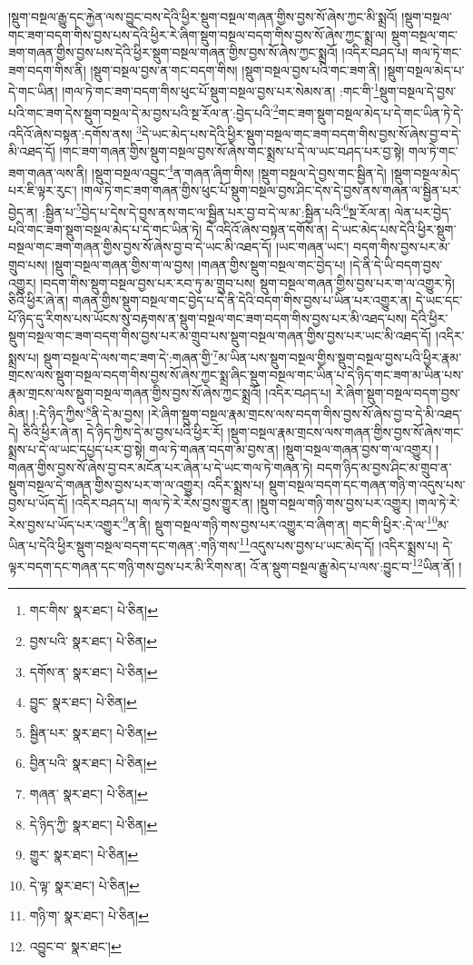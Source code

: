 །སྡུག་བསྔལ་རྒྱུ་དང་རྐྱེན་ལས་བྱུང་བས་དེའི་ཕྱིར་སྡུག་བསྔལ་གཞན་གྱིས་བྱས་སོ་ཞེས་ཀྱང་མི་སྨྲའོ། །སྡུག་བསྔལ་གང་ཟག་བདག་གིས་བྱས་པས་དེའི་ཕྱིར་རེ་ཞིག་སྡུག་བསྔལ་བདག་གིས་བྱས་སོ་ཞེས་ཀྱང་སྨྲ་ལ། སྡུག་བསྔལ་གང་ཟག་གཞན་གྱིས་བྱས་པས་དེའི་ཕྱིར་སྡུག་བསྔལ་གཞན་གྱིས་བྱས་སོ་ཞེས་ཀྱང་སྨྲའོ། །འདིར་བཤད་པ། གལ་ཏེ་གང་ཟག་བདག་གིས་ནི། །སྡུག་བསྔལ་བྱས་ན་གང་བདག་གིས། །སྡུག་བསྔལ་བྱས་པའི་གང་ཟག་ནི། །སྡུག་བསྔལ་མེད་པ་དེ་གང་ཡིན། །གལ་ཏེ་གང་ཟག་བདག་གིས་ཕུང་པོ་སྡུག་བསྔལ་བྱས་པར་སེམས་ན། :གང་གི་\footnote{གང་གིས་  སྣར་ཐང་།  པེ་ཅིན། }སྡུག་བསྔལ་དེ་བྱས་པའི་གང་ཟག་དེས་སྡུག་བསྔལ་དེ་མ་བྱས་པའི་སྔ་རོལ་ན་:བྱེད་པའི་\footnote{བྱས་པའི་  སྣར་ཐང་།  པེ་ཅིན། }གང་ཟག་སྡུག་བསྔལ་མེད་པ་དེ་གང་ཡིན་ཏེ་དེ་འདིའོ་ཞེས་བསྟན་:དགོས་ནས། \footnote{དགོས་ན་  སྣར་ཐང་།  པེ་ཅིན། }དེ་ཡང་མེད་པས་དེའི་ཕྱིར་སྡུག་བསྔལ་གང་ཟག་བདག་གིས་བྱས་སོ་ཞེས་བྱ་བ་དེ་མི་འཐད་དོ། །གང་ཟག་གཞན་གྱིས་སྡུག་བསྔལ་བྱས་སོ་ཞེས་གང་སྨྲས་པ་དེ་ལ་ཡང་བཤད་པར་བྱ་སྟེ། གལ་ཏེ་གང་ཟག་གཞན་ལས་ནི། །སྡུག་བསྔལ་འབྱུང་\footnote{བྱུང་  སྣར་ཐང་།  པེ་ཅིན། }ན་གཞན་ཞིག་གིས། །སྡུག་བསྔལ་དེ་བྱས་གང་སྦྱིན་དེ། །སྡུག་བསྔལ་མེད་པར་ཇི་ལྟར་རུང་། །གལ་ཏེ་གང་ཟག་གཞན་གྱིས་ཕུང་པོ་སྡུག་བསྔལ་བྱས་ཤིང་དེས་དེ་བྱས་ནས་གཞན་ལ་སྦྱིན་པར་བྱེད་ན། :སྦྱིན་པ་\footnote{སྦྱིན་པར་  སྣར་ཐང་།  པེ་ཅིན། }བྱེད་པ་དེས་དེ་བྱས་ནས་གང་ལ་སྦྱིན་པར་བྱ་བ་དེ་ལ་མ་:སྦྱིན་པའི་\footnote{བྱིན་པའི་  སྣར་ཐང་།  པེ་ཅིན། }སྔ་རོལ་ན། ལེན་པར་བྱེད་པའི་གང་ཟག་སྡུག་བསྔལ་མེད་པ་དེ་གང་ཡིན་ཏེ། དེ་འདིའོ་ཞེས་བསྟན་དགོས་ན། དེ་ཡང་མེད་པས་དེའི་ཕྱིར་སྡུག་བསྔལ་གང་ཟག་གཞན་གྱིས་བྱས་སོ་ཞེས་བྱ་བ་དེ་ཡང་མི་འཐད་དོ། །ཡང་གཞན་ཡང་། བདག་གིས་བྱས་པར་མ་གྲུབ་པས། །སྡུག་བསྔལ་གཞན་གྱིས་ག་ལ་བྱས། །གཞན་གྱིས་སྡུག་བསྔལ་གང་བྱེད་པ། །དེ་ནི་དེ་ཡི་བདག་བྱས་འགྱུར། །བདག་གིས་སྡུག་བསྔལ་བྱས་པར་རབ་ཏུ་མ་གྲུབ་པས། སྡུག་བསྔལ་གཞན་གྱིས་བྱས་པར་ག་ལ་འགྱུར་ཏེ། ཅིའི་ཕྱིར་ཞེ་ན། གཞན་གྱིས་སྡུག་བསྔལ་གང་བྱེད་པ་དེ་ནི་དེའི་བདག་གིས་བྱས་པ་ཡིན་པར་འགྱུར་ན། དེ་ཡང་དང་པོ་ཉིད་དུ་རིགས་པས་ཡོངས་སུ་བརྟགས་ན་སྡུག་བསྔལ་གང་ཟག་བདག་གིས་བྱས་པར་མི་འཐད་པས། དེའི་ཕྱིར་སྡུག་བསྔལ་གང་ཟག་བདག་གིས་བྱས་པར་མ་གྲུབ་པས་སྡུག་བསྔལ་གཞན་གྱིས་བྱས་པར་ཡང་མི་འཐད་དོ། །འདིར་སྨྲས་པ། སྡུག་བསྔལ་དེ་ལས་གང་ཟག་དེ་:གཞན་གྱི་\footnote{གཞན་  སྣར་ཐང་།  པེ་ཅིན། }མ་ཡིན་པས་སྡུག་བསྔལ་གྱིས་སྡུག་བསྔལ་བྱས་པའི་ཕྱིར་རྣམ་གྲངས་ལས་སྡུག་བསྔལ་བདག་གིས་བྱས་སོ་ཞེས་ཀྱང་སྨྲ་ཞིང་སྡུག་བསྔལ་གང་ཡིན་པ་དེ་ཉིད་གང་ཟག་མ་ཡིན་པས་རྣམ་གྲངས་ལས་སྡུག་བསྔལ་གཞན་གྱིས་བྱས་སོ་ཞེས་ཀྱང་སྨྲའོ། །འདིར་བཤད་པ། རེ་ཞིག་སྡུག་བསྔལ་བདག་བྱས་མིན། །:དེ་ཉིད་ཀྱིས་\footnote{དེ་ཉིད་ཀྱི་  སྣར་ཐང་།  པེ་ཅིན། }ནི་དེ་མ་བྱས། །རེ་ཞིག་སྡུག་བསྔལ་རྣམ་གྲངས་ལས་བདག་གིས་བྱས་སོ་ཞེས་བྱ་བ་དེ་མི་འཐད་དེ། ཅིའི་ཕྱིར་ཞེ་ན། དེ་ཉིད་ཀྱིས་དེ་མ་བྱས་པའི་ཕྱིར་རོ། །སྡུག་བསྔལ་རྣམ་གྲངས་ལས་གཞན་གྱིས་བྱས་སོ་ཞེས་གང་སྨྲས་པ་དེ་ལ་ཡང་དཔྱད་པར་བྱ་སྟེ། གལ་ཏེ་གཞན་བདག་མ་བྱས་ན། །སྡུག་བསྔལ་གཞན་བྱས་ག་ལ་འགྱུར། །གཞན་གྱིས་བྱས་སོ་ཞེས་བྱ་བར་མངོན་པར་ཞེན་པ་དེ་ཡང་གལ་ཏེ་གཞན་ཏེ། བདག་ཉིད་མ་བྱས་ཤིང་མ་གྲུབ་ན་སྡུག་བསྔལ་དེ་གཞན་གྱིས་བྱས་པར་ག་ལ་འགྱུར། འདིར་སྨྲས་པ། སྡུག་བསྔལ་བདག་དང་གཞན་གཉི་ག་འདུས་པས་བྱས་པ་ཡོད་དོ། །འདིར་བཤད་པ། གལ་ཏེ་རེ་རེས་བྱས་གྱུར་ན། །སྡུག་བསྔལ་གཉི་གས་བྱས་པར་འགྱུར། །གལ་ཏེ་རེ་རེས་བྱས་པ་ཡོད་པར་འགྱུར་\footnote{གྱུར་  སྣར་ཐང་།  པེ་ཅིན། }ན་ནི། སྡུག་བསྔལ་གཉི་གས་བྱས་པར་འགྱུར་བ་ཞིག་ན། གང་གི་ཕྱིར་:དེ་ལ་\footnote{དེ་ལྟ་  སྣར་ཐང་།  པེ་ཅིན། }མ་ཡིན་པ་དེའི་ཕྱིར་སྡུག་བསྔལ་བདག་དང་གཞན་:གཉི་གས་\footnote{གཉི་ག་  སྣར་ཐང་།  པེ་ཅིན། }འདུས་པས་བྱས་པ་ཡང་མེད་དོ། །འདིར་སྨྲས་པ། དེ་ལྟར་བདག་དང་གཞན་དང་གཉི་གས་བྱས་པར་མི་རིགས་ན། འོ་ན་སྡུག་བསྔལ་རྒྱུ་མེད་པ་ལས་:བྱུང་བ་\footnote{འབྱུང་བ་  སྣར་ཐང་། }ཡིན་ནོ། །
